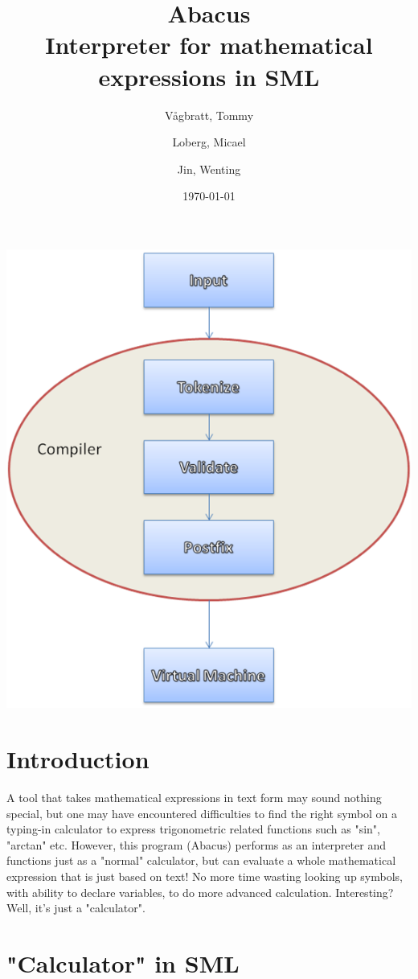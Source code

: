 \documentclass[12pt,a4paper]{article}
\title {Abacus \\ Interpreter for mathematical expressions in SML}
\author{
  Vågbratt, Tommy
  \and
  Loberg, Micael
	\and
  Jin, Wenting}
\date{\today}
\begin{document}
\maketitle
\tableofcontents
\newpage


\includegraphics[width=\textwidth]{Structure}

\section{Introduction}
\textnormal{A tool that takes mathematical expressions in text form may sound nothing special, but one may have encountered difficulties to find the right symbol on a typing-in calculator to express trigonometric related functions such as "sin", "arctan" etc. However, this program (Abacus) performs as an interpreter and functions just as a "normal" calculator, but can evaluate a whole mathematical expression that is just based on text! No more time wasting looking up symbols, with ability to declare variables, to do more advanced calculation. Interesting? Well, it's just a "calculator".}

\section{"Calculator" in SML}
\end{document}
